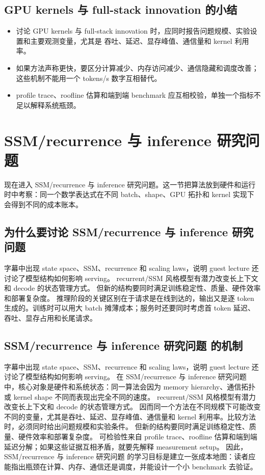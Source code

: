 \documentclass[a4paper]{article}
\begin{document}
\subsection{GPU kernels 与 full-stack innovation 的小结}
\begin{itemize}
\item 讨论 GPU kernels 与 full-stack innovation 时，应同时报告问题规模、实验设置和主要观测变量，尤其是 吞吐、延迟、显存峰值、通信量和 kernel 利用率。
\item 如果方法声称更快，要区分计算减少、内存访问减少、通信隐藏和调度改善；这些机制不能用一个 tokens/s 数字互相替代。
\item profile trace、roofline 估算和端到端 benchmark 应互相校验，单独一个指标不足以解释系统瓶颈。
\end{itemize}
\section{SSM/recurrence 与 inference 研究问题}
现在进入 SSM/recurrence 与 inference 研究问题。这一节把算法放到硬件和运行时中考察：同一个数学表达式在不同 batch、shape、GPU 拓扑和 kernel 实现下会得到不同的成本账本。
\subsection{为什么要讨论 SSM/recurrence 与 inference 研究问题}
字幕中出现 state space、SSM、recurrence 和 scaling laws，说明 guest lecture 还讨论了模型结构如何影响 serving。
recurrent/SSM 风格模型有潜力改变长上下文和 decode 的状态管理方式。
但新的结构要同时满足训练稳定性、质量、硬件效率和部署复杂度。
推理阶段的关键区别在于请求是在线到达的，输出又是逐 token 生成的。训练时可以用大 batch 摊薄成本；服务时还要同时考虑首 token 延迟、吞吐、显存占用和长尾请求。
\subsection{SSM/recurrence 与 inference 研究问题 的机制}
字幕中出现 state space、SSM、recurrence 和 scaling laws，说明 guest lecture 还讨论了模型结构如何影响 serving。 在 SSM/recurrence 与 inference 研究问题 中，核心对象是硬件和系统状态：同一算法会因为 memory hierarchy、通信拓扑或 kernel shape 不同而表现出完全不同的速度。
recurrent/SSM 风格模型有潜力改变长上下文和 decode 的状态管理方式。 因而同一个方法在不同规模下可能改变不同的变量，尤其是吞吐、延迟、显存峰值、通信量和 kernel 利用率。比较方法时，必须同时给出问题规模和实验条件。
但新的结构要同时满足训练稳定性、质量、硬件效率和部署复杂度。 可检验性来自 profile trace、roofline 估算和端到端延迟分解；如果这些证据互相矛盾，就要先解释 measurement setup。
因此，SSM/recurrence 与 inference 研究问题 的学习目标是建立一张成本地图：读者应能指出瓶颈在计算、内存、通信还是调度，并能设计一个小 benchmark 去验证。
\end{document}
